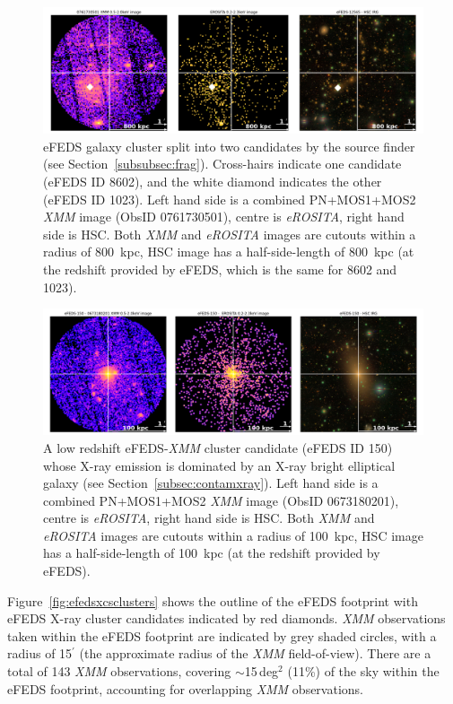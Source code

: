 \documentclass[fleqn,usenatbib]{mnras}
\begin{document}
\begin{figure}
    \centering
    \includegraphics[width=1\textwidth]{images/split_cluster_hsc.png}
    \caption[]{eFEDS galaxy cluster split into two candidates by the source finder (see Section~\ref{subsubsec:frag}). Cross-hairs indicate one candidate (eFEDS ID 8602), and the white diamond indicates the other (eFEDS ID 1023). Left hand side is a combined PN+MOS1+MOS2 {\em XMM} image (ObsID 0761730501), centre is {\em eROSITA}, right hand side is HSC. Both {\em XMM} and {\em eROSITA} images are cutouts within a radius of 800~kpc, HSC image has a half-side-length of 800~kpc (at the redshift provided by eFEDS, which is the same for 8602 and 1023).}
    \label{fig:splitcluster}
\end{figure}

\begin{figure}
    \centering
    \includegraphics[width=1\textwidth]{images/elliptical_xray_hsc.png}
    \caption[]{A low redshift eFEDS-{\em XMM} cluster candidate (eFEDS ID 150) whose X-ray emission is dominated by an X-ray bright elliptical galaxy (see Section~\ref{subsec:contamxray}). Left hand side is a combined PN+MOS1+MOS2 {\em XMM} image (ObsID 0673180201), centre is {\em eROSITA}, right hand side is HSC. Both {\em XMM} and {\em eROSITA} images are cutouts within a radius of 100~kpc, HSC image has a half-side-length of 100~kpc (at the redshift provided by eFEDS).}
    \label{fig:ellipticalxray}
\end{figure}

Figure~\ref{fig:efedsxcsclusters} shows the outline of the eFEDS footprint with eFEDS X-ray cluster candidates \citep{efedsclustercat} indicated by red diamonds. {\em XMM} observations taken within the eFEDS footprint are indicated by grey shaded circles, with a radius of 15$^{\prime}$ (the approximate radius of the {\em XMM} field-of-view). There are a total of 143 {\em XMM} observations, covering ${\sim}$15\,deg$^{2}$ (11\%) of the sky within the eFEDS footprint, accounting for overlapping {\em XMM} observations.
\end{document}
